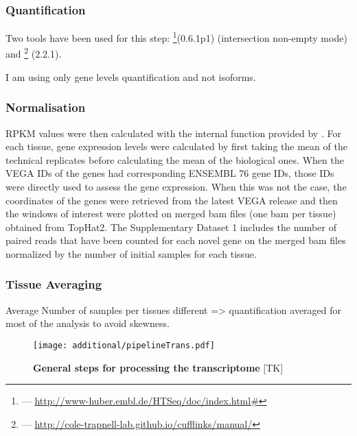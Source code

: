 \subsubsection{Quantification}
Two tools have been used for this step: \footnote{%
 --- \href{http://www-huber.embl.de/HTSeq/doc/index.html\#}%
{http://www-huber.embl.de/HTSeq/doc/index.html\#}}(0.6.1p1) (intersection
non-empty mode) and \footnote{ ---
\href{http://cole-trapnell-lab.github.io/cufflinks/manual/}%
{http://cole-trapnell-lab.github.io/cufflinks/manual/}} (2.2.1).

I am using only gene levels quantification and not isoforms.

\subsubsection{Normalisation}
\gls{RPKM}
values were then calculated with the internal function provided by \irap. For each
tissue, gene expression levels were calculated by first taking the mean of the
technical replicates before calculating the mean of the biological ones. When the
VEGA IDs of the genes had corresponding ENSEMBL 76 gene IDs, those IDs were
directly used to assess the gene expression. When this was not the case, the
coordinates of the genes were retrieved from the latest VEGA release and then the
windows of interest were plotted on merged bam files (one bam per tissue)
obtained from TopHat2. The Supplementary Dataset 1 includes the number of
paired reads that have been counted for each novel gene on the merged bam files
normalized by the number of initial samples for each tissue.



\subsubsection{Tissue Averaging}
Average Number of samples per tissues different => quantification averaged for
most of the analysis to avoid skewness.





\begin{figure}
    \texttt{[image: additional/pipelineTrans.pdf]}\centering
    \caption[General steps for processing the transcriptomic
    data]{\label{fig:pipelineTrans}\textbf{General steps for processing the
    transcriptome} [TK]}
  \end{figure}


